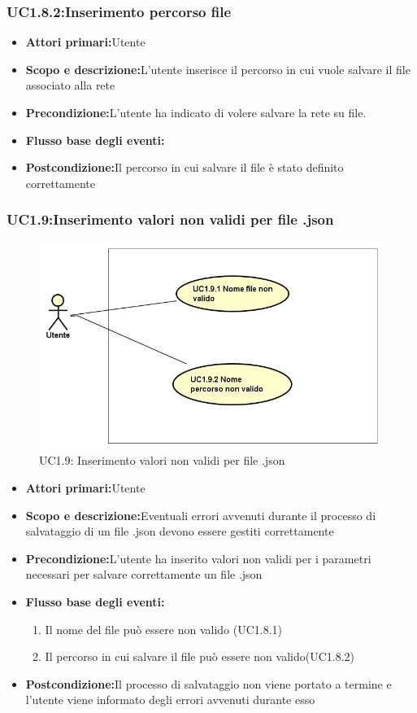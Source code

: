 \subsubsection{UC1.8.2:Inserimento percorso file}
\begin{itemize}
	\item{\textbf{Attori primari:}Utente}
	\item{\textbf{Scopo e descrizione:}L'utente inserisce il percorso in cui vuole salvare il file associato alla rete}
	\item{\textbf{Precondizione:}L'utente ha indicato di volere salvare la rete su file.}
	\item{\textbf{Flusso base degli eventi:}}
	\item{\textbf{Postcondizione:}Il percorso in cui salvare il file è stato definito correttamente}
\end{itemize}
\subsubsection{UC1.9:Inserimento valori non validi per file .json}
\begin{figure} [H]
	\centering
	\includegraphics[scale=0.45]{Img/UC1-9}
	\caption{UC1.9: Inserimento valori non validi per file .json}\label{}
\end{figure}
\begin{itemize}
	\item{\textbf{Attori primari:}Utente}
	\item{\textbf{Scopo e descrizione:}Eventuali errori avvenuti durante il processo di salvataggio di un file .json devono essere gestiti correttamente}
	\item{\textbf{Precondizione:}L'utente ha inserito valori non validi per i parametri necessari per salvare correttamente un file .json}
	\item{\textbf{Flusso base degli eventi:}}
	\begin{enumerate}
		\item{Il nome del file può essere non valido (UC1.8.1)}
		\item{Il percorso in cui salvare il file può essere non valido(UC1.8.2)}
	\end{enumerate}
	\item{\textbf{Postcondizione:}Il processo di salvataggio non viene portato a termine e l'utente viene informato degli errori avvenuti durante esso}
\end{itemize}
